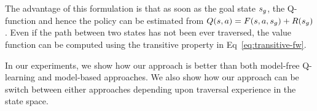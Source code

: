 The advantage of this formulation is that as soon as the goal state $s_g$, the Q-function and
hence the policy can be estimated from $Q(s, a) = F(s, a, s_g) + R(s_g)$.
Even if the path between two states has not been ever traversed, the value function
can be computed using the transitive property in Eq~\ref{eq:transitive-fw}. 

In our experiments, we show how our approach is better than both model-free Q-learning and model-based approaches. We also show how our approach can be switch between either approaches depending upon traversal experience in the state space.
